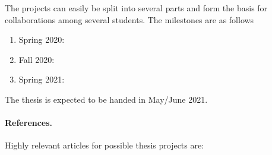 \documentclass[%
oneside,                 %
final,                   %
10pt]{article}
\begin{document}
The projects can easily be split into several parts and form the basis for collaborations among several students. The milestones are as follows
\begin{enumerate}
\item Spring 2020: 

\item Fall 2020: 

\item Spring 2021: 
\end{enumerate}

\noindent
The thesis is expected to be handed in May/June  2021.

\paragraph{References.}
Highly relevant articles for possible thesis projects are:


\end{document}

